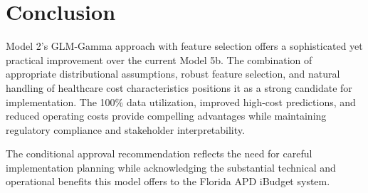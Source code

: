 \section{Conclusion}

Model 2's GLM-Gamma approach with feature selection offers a sophisticated yet practical improvement over the current Model 5b. The combination of appropriate distributional assumptions, robust feature selection, and natural handling of healthcare cost characteristics positions it as a strong candidate for implementation. The 100\% data utilization, improved high-cost predictions, and reduced operating costs provide compelling advantages while maintaining regulatory compliance and stakeholder interpretability.

The conditional approval recommendation reflects the need for careful implementation planning while acknowledging the substantial technical and operational benefits this model offers to the Florida APD iBudget system.